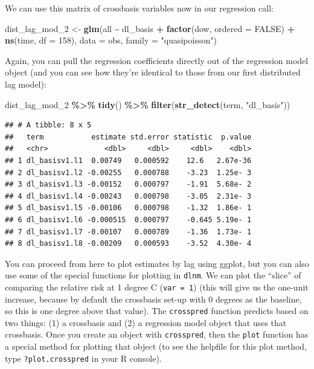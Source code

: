 \documentclass[
]{book}
\newenvironment{Shaded}{\begin{snugshade}}{\end{snugshade}}
\newcommand{\AttributeTok}[1]{\textcolor[rgb]{0.13,0.29,0.53}{#1}}
\newcommand{\ConstantTok}[1]{\textcolor[rgb]{0.56,0.35,0.01}{#1}}
\newcommand{\DecValTok}[1]{\textcolor[rgb]{0.00,0.00,0.81}{#1}}
\newcommand{\FunctionTok}[1]{\textcolor[rgb]{0.13,0.29,0.53}{\textbf{#1}}}
\newcommand{\NormalTok}[1]{#1}
\newcommand{\OtherTok}[1]{\textcolor[rgb]{0.56,0.35,0.01}{#1}}
\newcommand{\SpecialCharTok}[1]{\textcolor[rgb]{0.81,0.36,0.00}{\textbf{#1}}}
\newcommand{\StringTok}[1]{\textcolor[rgb]{0.31,0.60,0.02}{#1}}
\begin{document}
We can use this matrix of crossbasis variables now in our regression call:

\begin{Shaded}
\begin{Highlighting}[]
\NormalTok{dist\_lag\_mod\_2 }\OtherTok{\textless{}{-}} \FunctionTok{glm}\NormalTok{(all }\SpecialCharTok{\textasciitilde{}}\NormalTok{ dl\_basis }\SpecialCharTok{+} 
                        \FunctionTok{factor}\NormalTok{(dow, }\AttributeTok{ordered =} \ConstantTok{FALSE}\NormalTok{) }\SpecialCharTok{+}
                          \FunctionTok{ns}\NormalTok{(time, }\AttributeTok{df =} \DecValTok{158}\NormalTok{), }
                        \AttributeTok{data =}\NormalTok{ obs, }\AttributeTok{family =} \StringTok{"quasipoisson"}\NormalTok{)}
\end{Highlighting}
\end{Shaded}

Again, you can pull the regression coefficients directly out of the regression model object
(and you can see how they're identical to those from our first distributed lag model):

\begin{Shaded}
\begin{Highlighting}[]
\NormalTok{dist\_lag\_mod\_2 }\SpecialCharTok{\%\textgreater{}\%} 
  \FunctionTok{tidy}\NormalTok{() }\SpecialCharTok{\%\textgreater{}\%} 
  \FunctionTok{filter}\NormalTok{(}\FunctionTok{str\_detect}\NormalTok{(term, }\StringTok{"dl\_basis"}\NormalTok{))}
\end{Highlighting}
\end{Shaded}

\begin{verbatim}
## # A tibble: 8 x 5
##   term           estimate std.error statistic  p.value
##   <chr>             <dbl>     <dbl>     <dbl>    <dbl>
## 1 dl_basisv1.l1  0.00749   0.000592    12.6   2.67e-36
## 2 dl_basisv1.l2 -0.00255   0.000788    -3.23  1.25e- 3
## 3 dl_basisv1.l3 -0.00152   0.000797    -1.91  5.68e- 2
## 4 dl_basisv1.l4 -0.00243   0.000798    -3.05  2.31e- 3
## 5 dl_basisv1.l5 -0.00106   0.000798    -1.32  1.86e- 1
## 6 dl_basisv1.l6 -0.000515  0.000797    -0.645 5.19e- 1
## 7 dl_basisv1.l7 -0.00107   0.000789    -1.36  1.73e- 1
## 8 dl_basisv1.l8 -0.00209   0.000593    -3.52  4.30e- 4
\end{verbatim}

You can proceed from here to plot estimates by lag using ggplot, but you can also use
some of the special functions for plotting in \texttt{dlnm}. We can plot the ``slice'' of comparing
the relative risk at 1 degree C (\texttt{var\ =\ 1}) (this will give us the one-unit increase,
because by default the crossbasis set-up with 0 degrees as the baseline, so this is
one degree above that value). The \texttt{crosspred} function predicts based on two things: (1)
a crossbasis and (2) a regression model object that uses that crossbasis. Once you create
an object with \texttt{crosspred}, then the \texttt{plot} function has a
special method for plotting that object (to see the helpfile for this
plot method, type \texttt{?plot.crosspred} in your R console).
\end{document}
